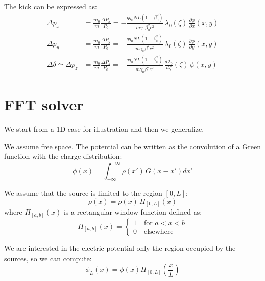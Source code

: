 \documentclass[a4paper,12pt]{report}
\begin{document}
The kick can be expressed as:
\begin{align}
\Delta p_x &= \frac{m_0}{m}\frac{\Delta P_x} {P_0}= -\frac{qq_0NL (1-\beta_0^2)}{ m\gamma_0\beta_0^2 c^2} \,\lambda_0(\zeta)\,\frac{\partial \phi}{\partial x}\left(x, y\right)\label{dpx_mod}\\
\Delta p_y &= \frac{m_0}{m}\frac{\Delta P_y} {P_0}= -\frac{qq_0NL (1-\beta_0^2)}{ m\gamma_0\beta_0^2 c^2} \,\lambda_0(\zeta)\, \frac{\partial \phi}{\partial y}\left(x, y\right)\label{dpy_mod}\\
\Delta \delta \simeq \Delta p_z &= \frac{ m_0} {m}\frac{\Delta P_z} {P_0}= -\frac{qq_0NL (1-\beta_0^2)}{ m\gamma_0\beta_0^2 c^2} \,\frac{d\lambda_0}{d\zeta}(\zeta)\,\phi\left(x, y\right)\label{dpz_mod}
\end{align}

\section{FFT solver}

We start from a 1D case for illustration and then we generalize.

We assume free space. The potential can be written as the convolution of a Green function with the charge distribution:
\begin{equation}
\phi(x) = \int_{-\infty}^{+\infty} \rho(x')\,G(x-x') dx'
\label{eq:conv}
\end{equation}

We assume that the source is limited to the region  $[0, L]$:
\begin{equation}
\rho(x) = \rho(x)\,\Pi_{[0,L]}\left(x\right)
\label{eq:rholim}
\end{equation}
where $\Pi_{[a,b]}(x)$ is a rectangular window function defined as:
\begin{equation}
\Pi_{[a,b]}(x) = 
\begin{cases}
1\quad\text{for } a<x<b\\
0\quad\text{elsewhere}
\end{cases}
\end{equation}

We are interested in the electric potential only the region occupied by the sources, so we can compute:
\begin{equation}
\phi_L(x) = \phi(x) \Pi_[0, L]\left(\frac{x}{L}\right)
\label{eq:philim}
\end{equation}
\end{document}
